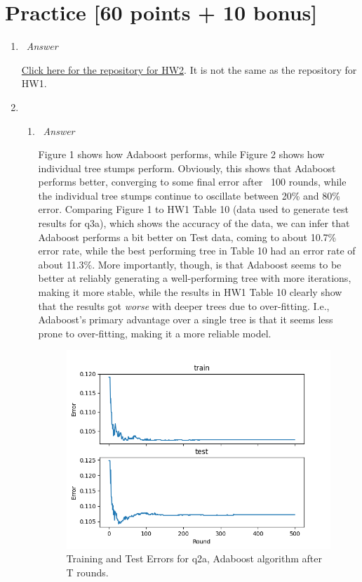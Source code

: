 \documentclass[12pt, fullpage,letterpaper]{article}
\begin{document}
\section{Practice [60 points + 10 bonus]}
\begin{enumerate}
	\item~\emph{Answer}
	
	\href{https://github.com/Paul-Wissler/cs-6350-hw2}{Click here for the repository for HW2}. It is not the same as the repository for HW1.

\item~
\begin{enumerate}
	\item~\emph{Answer}
	
	Figure 1 shows how Adaboost performs, while Figure 2 shows how individual tree stumps perform. Obviously, this shows that Adaboost performs better, converging to some final error after ~100 rounds, while the individual tree stumps continue to oscillate between 20\% and 80\% error. Comparing Figure 1 to HW1 Table 10 (data used to generate test results for q3a), which shows the accuracy of the data, we can infer that Adaboost performs a bit better on Test data, coming to about 10.7\% error rate, while the best performing tree in Table 10 had an error rate of about 11.3\%. More importantly, though, is that Adaboost seems to be better at reliably generating a well-performing tree with more iterations, making it more stable, while the results in HW1 Table 10 clearly show that the results got \emph{worse} with deeper trees due to over-fitting. I.e., Adaboost's primary advantage over a single tree is that it seems less prone to over-fitting, making it a more reliable model.
	
	\begin{figure}[htp]
        \centering
        \includegraphics[width=12cm]{q2a_cum_results.png}
        \caption{Training and Test Errors for q2a, Adaboost algorithm after T rounds.}
        \label{fig:q4a}
    \end{figure}
    

\end{enumerate}
\end{enumerate}
\end{document}
